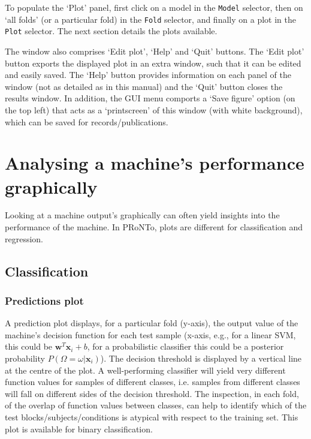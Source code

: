 To populate the `Plot' panel, first click on a model in the {\tt Model} selector, then on
`all folds' (or a particular fold) in the {\tt Fold} selector, and finally on a plot
in the {\tt Plot} selector. The next section details the plots available.

The window also comprises `Edit plot', `Help' and `Quit' buttons. The `Edit plot' button exports the displayed plot in an extra window, such
that it can be edited and easily saved. The `Help' button provides information on each panel of the window (not as detailed as in this
manual) and the `Quit' button closes the results window. In addition, the GUI menu comports a `Save figure' option (on the top left) that
acts as a `printscreen' of this window (with white background), which can be saved for records/publications.

\section{Analysing a machine's performance graphically}

Looking at a machine output's graphically can often yield insights into the performance
of the machine. In PRoNTo, plots are different for classification and regression.

\subsection{Classification}

\subsubsection{Predictions plot}

A prediction plot displays, for a particular fold (y-axis), the output value of the machine's
decision function for each test sample (x-axis, e.g., for a linear SVM, this could be $\mathbf{w}^T\mathbf{x}_i + b$,
for a probabilistic classifier this could be a posterior probability $P(\Omega=\omega | \mathbf{x}_i)$). The decision threshold is displayed by a vertical line at the centre of the plot.
A well-performing classifier will yield very different function values for samples of different
classes, i.e. samples from different classes will fall on different sides of the decision threshold. 
The inspection, in each fold, of the overlap of function values between classes, can help to identify which of the test blocks/subjects/conditions is atypical with respect to the training set.  
This plot is available for binary classification.


